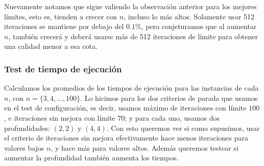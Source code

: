 \begin{figure}[H]
    \begin{minipage}[t]{\linewidth}
		\centering
		\label{fig:ejercicio-5-calidad-mejores-conjunto-1}
    \end{minipage}
\end{figure}

Nuevamente notamos que sigue valiendo la observación anterior para los mejores límites, esto es, tienden a crecer con $n$, incluso lo más altos. Solamente usar 512 iteraciones se mantiene por debajo del $0.1\%$, pero conjeturamos que al aumentar $n$, también crecerá y deberá usarse más de 512 iteraciones de límite para obtener una calidad menor a esa cota.

\subsubsection{Test de tiempo de ejecución}

Calculamos los promedios de los tiempos de ejecución para las instancias de cada $n$, con $n = \{3,4,...,100\}$. Lo hicimos para los dos criterios de parada que usamos en el test de configuración, es decir, usamos máximo de iteraciones con límite $100$, e iteraciones sin mejora con límite $70$; y para cada uno, usamos dos profundidades: $(2,2)$ y $(4,4)$. Con esto queremos ver si como supusimos, usar el criterio de iteraciones sin mejora efectivamente hace menos iteraciones para valores bajos $n$, y hace más para valores altos. Además queremos testear si aumentar la profundidad también aumenta los tiempos.

